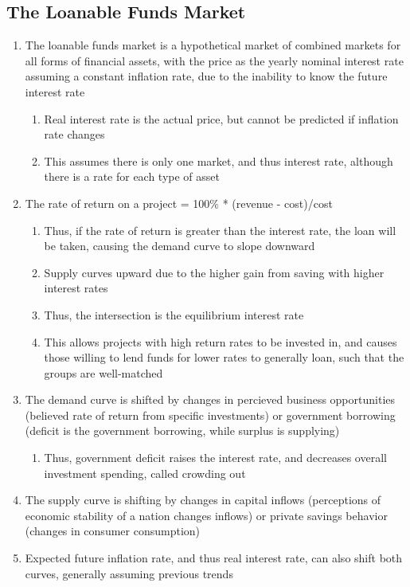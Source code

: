 
\subsection{The Loanable Funds Market}
\begin{enumerate}
\item The loanable funds market is a hypothetical market of combined markets for all forms of financial assets, with the price as the yearly nominal interest rate assuming a constant inflation rate, due to the inability to know the future interest rate
\begin{enumerate}
\item Real interest rate is the actual price, but cannot be predicted if inflation rate changes
\item This assumes there is only one market, and thus interest rate, although there is a rate for each type of asset
\end{enumerate}
\item The rate of return on a project = 100\% * (revenue - cost)/cost
\begin{enumerate}
\item Thus, if the rate of return is greater than the interest rate, the loan will be taken, causing the demand curve to slope downward
\item Supply curves upward due to the higher gain from saving with higher interest rates
\item Thus, the intersection is the equilibrium interest rate
\item This allows projects with high return rates to be invested in, and causes those willing to lend funds for lower rates to generally loan, such that the groups are well-matched
\end{enumerate}
\item The demand curve is shifted by changes in percieved business opportunities (believed rate of return from specific investments) or government borrowing (deficit is the government borrowing, while surplus is supplying)
\begin{enumerate}
\item Thus, government deficit raises the interest rate, and decreases overall investment spending, called crowding out
\end{enumerate}
\item The supply curve is shifting by changes in capital inflows (perceptions of economic stability of a nation changes inflows) or private savings behavior (changes in consumer consumption)
\item Expected future inflation rate, and thus real interest rate, can also shift both curves, generally assuming previous trends

\end{enumerate}
